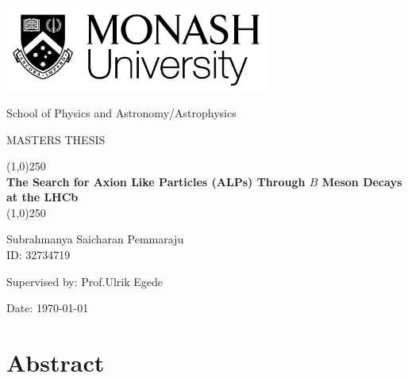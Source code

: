 \documentclass[11.5pt]{report}
\begin{document}
\label{firstpage}

\begin{titlepage}
    \begin{center}
        
        \vspace{1.5cm}
        \includegraphics[width=0.65\textwidth]{monashlogo.png}
        
        \large
        {School of Physics and Astronomy/Astrophysics}
        
        \vspace{2.5cm}
        \Large
        {MASTERS THESIS}
        
        \huge
        \line(1,0){250}\\
        \textbf{The Search for Axion Like Particles (ALPs) Through $B$ Meson Decays at the LHCb}\\
        \line(1,0){250}
        
        \vspace{2.0cm}
        \huge
        {Subrahmanya Saicharan Pemmaraju}\\
        \Large
        {ID: 32734719}
        
        \vspace{1.5cm}
        \huge
        {Supervised by: Prof.Ulrik Egede}
        
        \vspace{5.5cm}
        \Large
        {Date: \today}
        
    \end{center}
\end{titlepage}


\newpage
\chapter*{Abstract}

\newpage


\newpage
\tableofcontents
\end{document}
